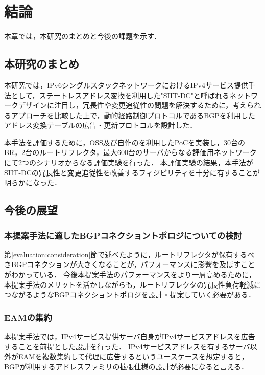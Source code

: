 \chapter{結論}
\label{conclusion}

本章では，本研究のまとめと今後の課題を示す．

\section{本研究のまとめ}
本研究では，IPv6シングルスタックネットワークにおけるIPv4サービス提供手法として，ステートレスアドレス変換を利用した"SIIT-DC"と呼ばれるネットワークデザインに注目し，冗長性や変更追従性の問題を解決するために，考えられるアプローチを比較した上で，動的経路制御プロトコルであるBGPを利用したアドレス変換テーブルの広告・更新プロトコルを設計した．

本手法を評価するために，OSS及び自作のを利用したPoCを実装し，30台のBR，2台のルートリフレクタ，最大600台のサーバからなる評価用ネットワークにて2つのシナリオからなる評価実験を行った．
本評価実験の結果，本手法がSIIT-DCの冗長性と変更追従性を改善するフィジビリティを十分に有することが明らかになった．

\section{今後の展望}
\subsection{本提案手法に適したBGPコネクショントポロジについての検討}
第\ref{evaluation:consideration}節で述べたように，ルートリフレクタが保有するべきBGPコネクションが大きくなることが，パフォーマンスに影響を及ぼすことがわかっている．
今後本提案手法のパフォーマンスをより一層高めるために，本提案手法のメリットを活かしながらも，ルートリフレクタの冗長性負荷軽減につながるようなBGPコネクショントポロジを設計・提案していく必要がある．


\subsection{EAMの集約}
本提案手法では，IPv4サービス提供サーバ自身がIPv4サービスアドレスを広告することを前提とした設計を行った．
IPv4サービスアドレスを有するサーバ以外がEAMを複数集約して代理に広告するというユースケースを想定すると，BGPが利用するアドレスファミリの拡張仕様の設計が必要になると言える．


